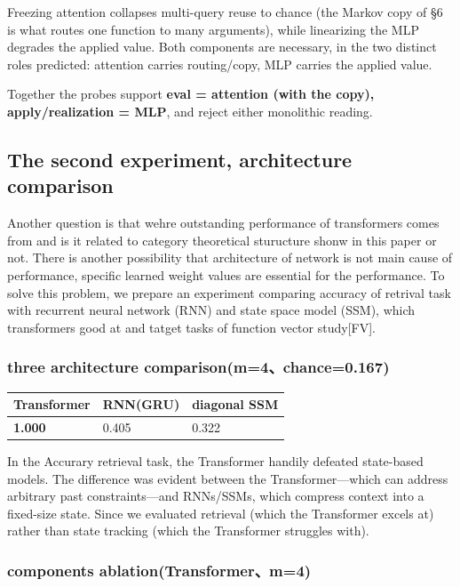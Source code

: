 \documentclass[a4paper,11pt]{article}
\begin{document}
Freezing attention collapses multi-query reuse to chance (the Markov
copy of §6 is what routes one function to many arguments), while
linearizing the MLP degrades the applied value. Both components are
necessary, in the two distinct roles predicted: attention carries
routing/copy, MLP carries the applied value.

Together the probes support \textbf{eval = attention (with the copy), apply/realization = MLP}, and reject either monolithic reading.


\hypertarget{the-second-experiment-architecture-comparison}{%
\subsection{The second experiment, architecture comparison}\label{the-second-experiment-architecture-comparison}}

Another question is that wehre outstanding performance of transformers
comes from and is it related to category theoretical sturucture shonw in
this paper or not. There is another possibility that architecture of
network is not main cause of performance, specific learned weight values
are essential for the performance. To solve this problem, we prepare an
experiment comparing accuracy of retrival task with recurrent neural
network (RNN) and state space model (SSM), which transformers good at
and tatget tasks of function vector study{[}FV{]}.

\hypertarget{three-architecture-comparisonm4chance0.167}{%
\subsubsection{three architecture
comparison(m=4、chance=0.167)}\label{three-architecture-comparisonm4chance0.167}}

\begin{longtable}[]{@{}lll@{}}
\toprule
Transformer & RNN(GRU) & diagonal SSM\tabularnewline
\midrule
\endhead
\textbf{1.000} & 0.405 & 0.322\tabularnewline
\bottomrule
\end{longtable}

In the Accurary retrieval task, the Transformer handily defeated
state-based models. The difference was evident between the
Transformer---which can address arbitrary past constraints---and
RNNs/SSMs, which compress context into a fixed-size state. Since we
evaluated retrieval (which the Transformer excels at) rather than state
tracking (which the Transformer struggles with).

\hypertarget{components-ablationtransformerm4}{%
\subsubsection{components ablation(Transformer、m=4)}\label{components-ablationtransformerm4}}
\end{document}
